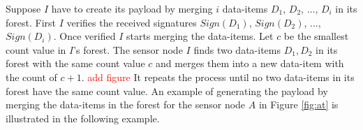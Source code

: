 	Suppose $I$ have to create its payload by merging $i$ data-items $D_{1}$, $D_{2}$, $\dotsc$, $D_{i}$ in its forest.
	First $I$ verifies the received signatures $Sign(D_{1})$, $Sign(D_{2})$, $\dotsc$, $Sign(D_{i})$.
	Once verified $I$ starts merging the data-items.
	Let $c$ be the smallest count value in $I$'s forest.
	The sensor node $I$ finds two data-items $D_{1},D_{2}$ in its forest with the same count value $c$ and merges them into a new data-item with the count of $c+1$.
	\textcolor{red}{add figure}
	It repeats the process until no two data-items in its forest have the same count value.
	An example of generating the payload by merging the data-items in the forest for the sensor node $A$ in Figure \ref{fig:at} is illustrated in the following example.

